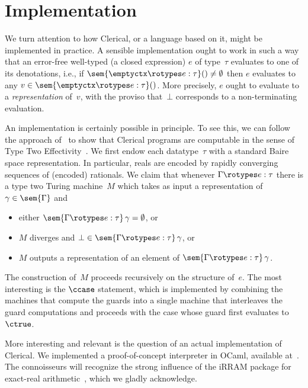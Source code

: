 \section{Implementation}
\label{sec:implementation}

We turn attention to how Clerical, or a language based on it, might be implemented in practice.
A sensible implementation ought to work in such a way that an error-free well-typed  (a closed expression) $e$ of type~$\tau$ evaluates to one of its denotations, i.e., if $\sem{\emptyctx \rotypes e : \tau}() \neq \emptyset$ then $e$ evaluates to any $v \in \sem{\emptyctx \rotypes e : \tau}()$. More precisely, $e$ ought to evaluate to a \emph{representation} of~$v$, with the proviso that~$\bot$ corresponds to a non-terminating evaluation.

An implementation is certainly possible in principle. To see this, we can follow the approach of~\cite{brausse2016semantics} to show that Clerical programs are computable in the sense of Type Two Effectivity~\cite{w00}. We first endow each datatype~$\tau$ with a standard Baire space representation. In particular, reals are encoded by rapidly converging sequences of (encoded) rationals. We claim that whenever $\Gamma \rotypes e : \tau$ there is a type two Turing machine~$M$ which takes as input a representation of $\gamma \in \sem{\Gamma}$ and
%
\begin{itemize}
\item either $\sem{\Gamma \rotypes e : \tau} \, \gamma = \emptyset$, or
\item $M$ diverges and $\bot \in \sem{\Gamma \rotypes e : \tau} \, \gamma$, or
\item $M$ outputs a representation of an element of $\sem{\Gamma \rotypes e : \tau} \, \gamma$.
\end{itemize}
%
The construction of~$M$ proceeds recursively on the structure of~$e$. The most interesting is the $\ccase$ statement, which is implemented by combining the machines that compute the guards into a single machine that interleaves the guard computations and proceeds with the case whose guard first evaluates to~$\ctrue$.

More interesting and relevant is the question of an actual implementation of Clerical.
We implemented a proof-of-concept interpreter in OCaml, available at~\cite{clerical_ocaml}.
The connoisseurs will recognize the strong influence of the iRRAM package for exact-real arithmetic~\cite{muller2000irram}, which we gladly acknowledge.
%

